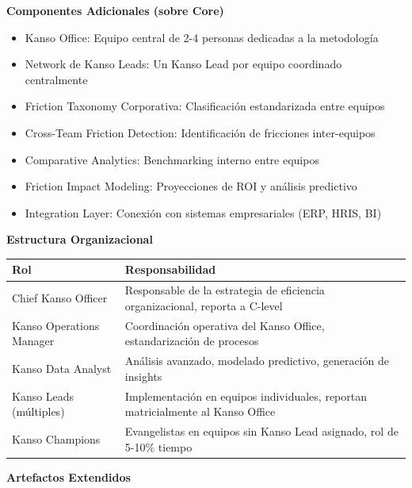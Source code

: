 \textbf{Componentes Adicionales (sobre Core)}
\begin{itemize}
    \item Kanso Office: Equipo central de 2-4 personas dedicadas a la metodología
    \item Network de Kanso Leads: Un Kanso Lead por equipo coordinado centralmente
    \item Friction Taxonomy Corporativa: Clasificación estandarizada entre equipos
    \item Cross-Team Friction Detection: Identificación de fricciones inter-equipos
    \item Comparative Analytics: Benchmarking interno entre equipos
    \item Friction Impact Modeling: Proyecciones de ROI y análisis predictivo
    \item Integration Layer: Conexión con sistemas empresariales (ERP, HRIS, BI)
\end{itemize}

\textbf{Estructura Organizacional}

\begin{center}
\small
\begin{tabular}{|p{4cm}|p{9cm}|}
\hline
\textbf{Rol} & \textbf{Responsabilidad} \\ \hline
Chief Kanso Officer & Responsable de la estrategia de eficiencia organizacional, reporta a C-level \\ \hline
Kanso Operations Manager & Coordinación operativa del Kanso Office, estandarización de procesos \\ \hline
Kanso Data Analyst & Análisis avanzado, modelado predictivo, generación de insights \\ \hline
Kanso Leads (múltiples) & Implementación en equipos individuales, reportan matricialmente al Kanso Office \\ \hline
Kanso Champions & Evangelistas en equipos sin Kanso Lead asignado, rol de 5-10\% tiempo \\ \hline
\end{tabular}
\end{center}

\textbf{Artefactos Extendidos}

